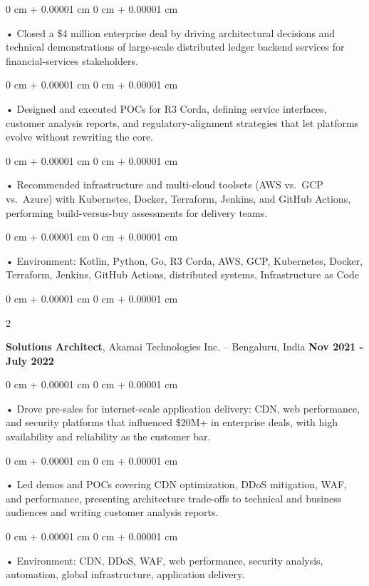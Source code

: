 \documentclass[10pt, letterpaper]{article}
\newenvironment{onecolentry}{
    \begin{adjustwidth}{
        0 cm + 0.00001 cm
    }{
        0 cm + 0.00001 cm
    }
}{
    \end{adjustwidth}
} %
\newenvironment{twocolentry}[2][]{
    \onecolentry
    \def\secondColumn{#2}
    \setcolumnwidth{\fill, 4.5 cm}
    \begin{paracol}{2}
}{
    \switchcolumn \raggedleft \secondColumn
    \end{paracol}
    \endonecolentry
} %
\begin{document}
        \begin{onecolentry}
             • Closed a \$4 million enterprise deal by driving architectural decisions and technical demonstrations of large-scale distributed ledger backend services for financial-services stakeholders.
        \end{onecolentry}
        \begin{onecolentry}
             • Designed and executed POCs for R3 Corda, defining service interfaces, customer analysis reports, and regulatory-alignment strategies that let platforms evolve without rewriting the core.
        \end{onecolentry}
        \begin{onecolentry}
             • Recommended infrastructure and multi-cloud toolsets (AWS vs.\ GCP vs.\ Azure) with Kubernetes, Docker, Terraform, Jenkins, and GitHub Actions, performing build-versus-buy assessments for delivery teams.
        \end{onecolentry}
        \begin{onecolentry}
             • Environment: Kotlin, Python, Go, R3 Corda, AWS, GCP, Kubernetes, Docker, Terraform, Jenkins, GitHub Actions, distributed systems, Infrastructure as Code
        \end{onecolentry}
        \vspace{0.1cm}

        \begin{twocolentry}{
            \textbf{Nov 2021 - July 2022}
        }
            \textbf{Solutions Architect}, Akamai Technologies Inc. -- Bengaluru, India \end{twocolentry}
        \begin{onecolentry}
            • Drove pre-sales for internet-scale application delivery: CDN, web performance, and security platforms that influenced \$20M+ in enterprise deals, with high availability and reliability as the customer bar.
        \end{onecolentry}
        \begin{onecolentry}
            • Led demos and POCs covering CDN optimization, DDoS mitigation, WAF, and performance, presenting architecture trade-offs to technical and business audiences and writing customer analysis reports.
        \end{onecolentry}
        \begin{onecolentry}
             • Environment: CDN, DDoS, WAF, web performance, security analysis, automation, global infrastructure, application delivery.
        \end{onecolentry}
\end{document}

